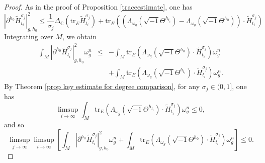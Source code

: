 \documentclass[12pt, reqno]{amsart}
\theoremstyle{plain}
\theoremstyle{definition}
\newcommand{\sq}{\sqrt{-1}}
\newcommand{\p}{\partial}
\newcommand{\beq}{\begin{equation}}
\newcommand{\eeq}{\end{equation}}
\renewcommand{\tilde}{\widetilde}
\renewcommand{\>}{\rightarrow}
\newcommand{\C}{{\mathbb C}}
\renewcommand{\>}{\rightarrow}
\renewcommand{\p}{{\partial}}
\newcommand{\om}{\omega}
\renewcommand{\tilde}{\widetilde}
\newcommand{\tr}{\mathrm{tr}}
\numberwithin{equation}{section} %
\begin{document}
\begin{proof}
    As in the proof of Proposition \ref{traceestimate},  one has
    \[
    \left|\p^{h_0}\tilde H_{t_i}^{\sigma_j}\right|_{g,h_0}^2
    \leq  \frac{1}{\sigma_j}\Delta_\C\left(\tr_E \tilde H_{t_i}^{\sigma_j}\right)
    +\tr_E\left(\left(\Lambda_{\om_g} \left(\sq\Theta^{h_{t_i}}\right)-\Lambda_{\om_g}\left(\sq \Theta^{h_0}\right)\right)\cdot \tilde H_{t_i}^{\sigma_j}\right)
    \]
    Integrating over $M$, we obtain
    \begin{eqnarray}
    \int_M  \left|\p^{h_0}\tilde H_{t_i}^{\sigma_j}\right|_{g,h_0}^2  \om_g^n
    &\leq& -\int_M\tr_E\left( \Lambda_{\om_g}\left(\sq \Theta^{h_0}\right) \cdot \tilde H_{t_i}^{\sigma_j}\right)\om_g^n\nonumber\\
    &&+ \int_M\tr_E\left(\Lambda_{\om_g}\left(\sq \Theta^{h_{t_i}}\right)\cdot \tilde H_{t_i}^{\sigma_j}\right)\om_g^n.
    \end{eqnarray}
    By Theorem \ref{prop key estimate for degree comparison}, for any $\sigma_j\in(0,1]$,  one has
    \beq
    \limsup_{i\to\infty} \int_M\tr_E\left(\Lambda_{\om_g}\left(\sq \Theta^{h_{t_i}}\right)\cdot \tilde H_{t_i}^{\sigma_j}\right)\om_g^n\leq 0,
    \eeq
    and so
    \beq
    \limsup_{j\to\infty}\limsup_{i\to\infty}
    \left[\int_M  \left|\p^{h_0}\tilde H_{t_i}^{\sigma_j}\right|_{g,h_0}^2  \om_g^n
    +\int_M\tr_E\left( \Lambda_{\om_g}\left(\sq \Theta^{h_0}\right) \cdot \tilde H_{t_i}^{\sigma_j}\right)\om_g^n
    \right]
    \leq 0.\label{deg estimate key}
    \eeq



\end{proof}
\end{document}

